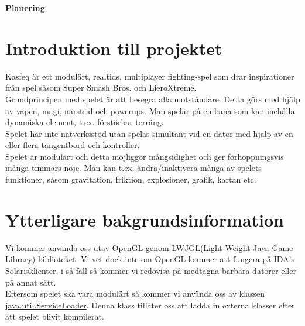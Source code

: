 \begin{center}
   \textbf{\Huge Planering}\\[1cm]
\end{center}
\section{Introduktion till projektet}
Kasfeq är ett modulärt, realtids, multiplayer fighting-spel som drar inspirationer från spel såsom Super Smash Bros. och LieroXtreme.\\
Grundprincipen med spelet är att besegra alla motståndare. Detta görs med hjälp av vapen, magi, närstrid och powerups. Man spelar på en bana som kan inehålla dynamiska element, t.ex. förstörbar terräng.\\
\vspace{11pt}
Spelet har inte nätverksstöd utan spelas simultant vid en dator med hjälp av en eller flera tangentbord och kontroller.\\
\vspace{11pt}
Spelet är modulärt och detta möjliggör mångsidighet och ger förhoppningsvis många timmars nöje. Man kan t.ex. ändra/inaktivera många av spelets funktioner, såsom gravitation, friktion, explosioner, grafik, kartan etc.\\

\section{Ytterligare bakgrundsinformation}
Vi kommer använda oss utav OpenGL genom \href{http://www.lwjgl.org/}{LWJGL}(Light Weight Java Game Library) biblioteket. Vi vet dock inte om OpenGL kommer att fungera på IDA's Solarisklienter, i så fall så kommer vi redovisa på medtagna bärbara datorer eller på annat sätt.\\
\vspace{11pt}
Eftersom spelet ska vara modulärt så kommer vi använda oss av klassen \href{http://docs.oracle.com/javase/6/docs/api/java/util/ServiceLoader.html}{java.util.ServiceLoader}. Denna klass tillåter oss att ladda in externa klasser efter att spelet blivit kompilerat.\\
